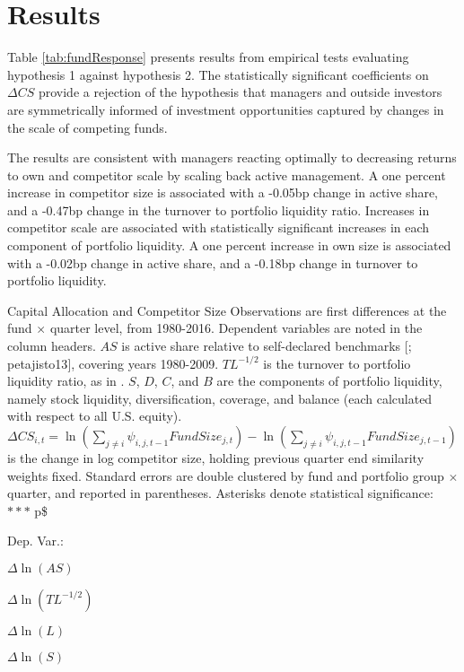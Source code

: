 \documentclass[]{book}
\theoremstyle{definition}
\theoremstyle{definition}
\theoremstyle{definition}
\theoremstyle{remark}
\begin{document}
\hypertarget{results}{%
\section{Results}\label{results}}

Table \ref{tab:fundResponse} presents results from empirical tests
evaluating hypothesis 1 against hypothesis 2. The statistically
significant coefficients on \(\Delta CS\) provide a rejection of the
hypothesis that managers and outside investors are symmetrically
informed of investment opportunities captured by changes in the scale of
competing funds.

The results are consistent with managers reacting optimally to
decreasing returns to own and competitor scale by scaling back active
management. A one percent increase in competitor size is associated with
a -0.05bp change in active share, and a -0.47bp change in the turnover
to portfolio liquidity ratio. Increases in competitor scale are
associated with statistically significant increases in each component of
portfolio liquidity. A one percent increase in own size is associated
with a -0.02bp change in active share, and a -0.18bp change in turnover
to portfolio liquidity.

\label{tab:fundResponse}Capital Allocation and Competitor Size Observations
are first differences at the fund \(\times\) quarter level, from
1980-2016. Dependent variables are noted in the column headers. \(AS\)
is active share relative to self-declared benchmarks {[}\citet{cp09};
petajisto13{]}, covering years 1980-2009. \(TL^{-1/2}\) is the turnover
to portfolio liquidity ratio, as in \citet{pst17L}. \(S\), \(D\), \(C\),
and \(B\) are the components of portfolio liquidity, namely stock
liquidity, diversification, coverage, and balance (each calculated with
respect to all U.S. equity).
\(\Delta CS_{i,t}=\ln\left(\sum_{j\neq i} \psi_{i,j,t-1} FundSize_{j,t} \right) - \ln\left(\sum_{j\neq i} \psi_{i,j,t-1} FundSize_{j,t-1}\right)\)
is the change in log competitor size, holding previous quarter end
similarity weights fixed. Standard errors are double clustered by fund
and portfolio group \(\times\) quarter, and reported in parentheses.
Asterisks denote statistical significance: \(\ast\ast\ast\) p\$

Dep. Var.:

\(\Delta\ln(AS)\)

\(\Delta\ln(TL^{-1/2})\)

\(\Delta\ln(L)\)

\(\Delta\ln(S)\)
\end{document}
